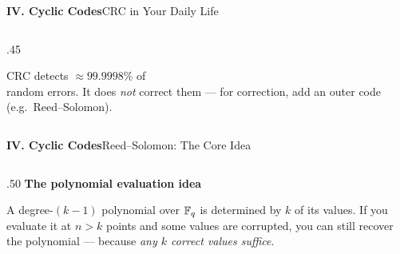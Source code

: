 \begin{frame}{\textbf{IV. Cyclic Codes}}{CRC in Your Daily Life}
\begin{columns}[T,onlytextwidth]
\begin{column}{.45\textwidth}
    \smallskip
    \begin{block}{}
    \centering\footnotesize
    CRC detects $\approx 99.9998\%$ of\\ random errors. It does \emph{not} correct them — for correction, add an outer code (e.g.\ Reed--Solomon).
    \end{block}
  \end{column}
\end{columns}
\end{frame}

\begin{frame}{\textbf{IV. Cyclic Codes}}{Reed--Solomon: The Core Idea}
\small
\begin{columns}[T,onlytextwidth]
  \begin{column}{.50\textwidth}
    \textcolor{TealDarkCyan}{\textbf{The polynomial evaluation idea}}

    \medskip
    A degree-$(k{-}1)$ polynomial over $\mathbb{F}_q$ is determined by $k$ of its values. If you evaluate it at $n > k$ points and some values are corrupted, you can still recover the polynomial — because \emph{any $k$ correct values suffice}.


\end{column}
\end{columns}
\end{frame}
